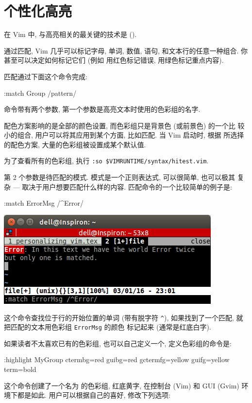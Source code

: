 \section{个性化高亮}
\label{sec:personal_highlighting}
在 Vim 中, 与高亮相关的最关键的技术是  ().

通过匹配, Vim 几乎可以标记字母, 单词, 数值, 语句, 和文本行的任意一种组合.
你甚至可以决定如何标记它们 (例如 用红色标记错误, 用绿色标记重点内容).

匹配通过下面这个命令完成:
\begin{vimcmd}
:match Group /pattern/
\end{vimcmd}
命令带有两个参数, 第一个参数是高亮文本时使用的色彩组的名字.
\begin{warning}
    配色方案影响的是全部的颜色设置, 而色彩组只是背景色 (或前景色) 的一个比
    较小的组合, 用户可以将其应用到某个方面, 比如匹配. 当 Vim 启动时, 根据
    所选择的配色方案, 大量的色彩组被设置成某个默认值.

    为了查看所有的色彩组, 执行 \texttt{:so \$VIMRUNTIME/syntax/hitest.vim}.
\end{warning}
第 2 个参数是待匹配的模式. 模式是一个正则表达式, 可以很简单, 也可以极其
复杂 --- 取决于用户想要匹配什么样的内容. 匹配命令的一个比较简单的例子是:
\begin{vimcmd}
:match ErrorMsg /^Error/
\end{vimcmd}
\begin{center}
\includegraphics[scale=0.7]{./images/page23.png}
\end{center}

这个命令查找位于行的开始位置的单词  (带有脱字符 \texttt{\^}),
如果找到了一个匹配, 就把匹配的文本用色彩组 \texttt{ErrorMsg} 的颜色
标记起来 (通常是红底白字).

如果读者不太喜欢已有的色彩组, 也可以自己定义一个, 定义色彩组的命令是:
\begin{vimcmd}
:highlight MyGroup ctermbg=red guibg=red gctermfg=yellow
        guifg=yellow term=bold
\end{vimcmd}
这个命令创建了一个名为  的色彩组, 红底黄字, 在控制台 (Vim)
和 GUI (Gvim) 环境下都是如此. 用户可以根据自己的喜好, 修改下列选项:

